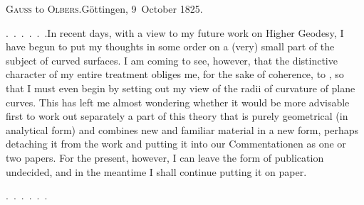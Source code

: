 \begin{center}
\textsc{Gauss} to \textsc{Olbers}.\quad Göttingen, 9~October 1825.
\end{center}

\par\noindent\hspace*{\parindent}\mbox{.\ .\ .\ .\ .\ .}\quad In recent days, with a view to my future work on Higher Geodesy, I have begun to put my thoughts in some order on a (very) small part of the subject of curved surfaces.
I am coming to see, however, that the distinctive character of my entire treatment obliges me, for the sake of coherence, to , so that I must even begin by setting out my view of the radii of curvature of plane curves.
This has left me almost wondering whether it would be more advisable first to work out separately a part of this theory that is purely geometrical (in analytical form) and combines new and familiar material in a new form, perhaps detaching it from the work and putting it into our Commentationen as one or two papers.
For the present, however, I can leave the form of publication undecided, and in the meantime I shall continue putting it on paper.
\par\nobreak\noindent\hspace*{\parindent}\mbox{.\ .\ .\ .\ .\ .}\par
